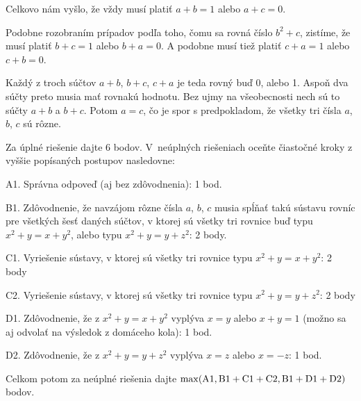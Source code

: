 {\smallskip\noindent
Celkovo nám vyšlo, že vždy musí platiť $a+b=1$ alebo $a+c=0$.

Podobne rozobraním prípadov podľa toho, čomu sa rovná číslo $b^2+c$, zistíme, že musí platiť $b+c=1$ alebo $b+a=0$. A podobne musí tiež platiť $c+a=1$ alebo $c+b=0$.

Každý z troch súčtov $a+b$, $b+c$, $c+a$ je teda rovný buď 0, alebo 1.
Aspoň dva súčty preto musia mať rovnakú hodnotu.
Bez ujmy na všeobecnosti nech sú to súčty $a+b$ a $b+c$.
Potom $a=c$, čo je spor s predpokladom, že všetky tri čísla $a$, $b$, $c$ sú rôzne.

\schemaABC
Za úplné riešenie dajte 6 bodov. V~neúplných riešeniach oceňte čiastočné kroky z vyššie popísaných postupov nasledovne:
\smallskip
\item{A1.} Správna odpoveď (aj bez zdôvodnenia): 1 bod.
\item{B1.} Zdôvodnenie, že navzájom rôzne čísla $a$, $b$, $c$ musia spĺňať takú sústavu rovníc pre všetkých šesť daných súčtov, v ktorej sú všetky tri rovnice buď typu $x^2+y=x+y^2$, alebo typu $x^2+y=y+z^2$: 2 body.
\item{C1.} Vyriešenie sústavy, v ktorej sú všetky tri rovnice typu $x^2+y=x+y^2$: 2 body
\item{C2.} Vyriešenie sústavy, v ktorej sú všetky tri rovnice typu $x^2+y=y+z^2$: 2 body
\item{D1.} Zdôvodnenie, že z $x^2+y=x+y^2$ vyplýva $x=y$ alebo $x+y=1$ (možno sa aj odvolať na výsledok z domáceho kola): 1 bod.
\item{D2.} Zdôvodnenie, že z $x^2+y=y+z^2$ vyplýva $x=z$ alebo $x=-z$: 1 bod.

\smallskip\noindent
Celkom potom za neúplné riešenia dajte $\rm\max(A1,B1+C1+C2,B1+D1+D2)$ bodov.
\endschema
}

